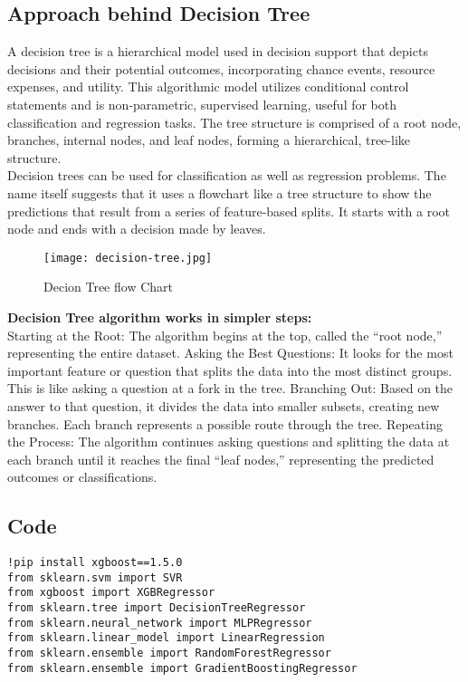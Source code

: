 \documentclass[12pt,a4paper]{report}
\begin{document}
\subsection{Approach behind Decision Tree}
A decision tree is a hierarchical model used in decision support that depicts decisions and their potential outcomes, incorporating chance events, resource expenses, and utility. This algorithmic model utilizes conditional control statements and is non-parametric, supervised learning, useful for both classification and regression tasks. The tree structure is comprised of a root node, branches, internal nodes, and leaf nodes, forming a hierarchical, tree-like structure.\\
Decision trees can be used for classification as well as regression problems. The name itself suggests that it uses a flowchart like a tree structure to show the predictions that result from a series of feature-based splits. It starts with a root node and ends with a decision made by leaves.
\begin{figure} [!ht]
    \centering
    \texttt{[image: decision-tree.jpg]}
    \caption{Decion Tree flow Chart}
    \label{fig:enter-label}
\end{figure}
\textbf{Decision Tree algorithm works in simpler steps:}\\
Starting at the Root: The algorithm begins at the top, called the “root node,” representing the entire dataset.
Asking the Best Questions: It looks for the most important feature or question that splits the data into the most distinct groups. This is like asking a question at a fork in the tree.
Branching Out: Based on the answer to that question, it divides the data into smaller subsets, creating new branches. Each branch represents a possible route through the tree.
Repeating the Process: The algorithm continues asking questions and splitting the data at each branch until it reaches the final “leaf nodes,” representing the predicted outcomes or classifications.
\subsection{Code}
\begin{lstlisting}
!pip install xgboost==1.5.0 
from sklearn.svm import SVR 
from xgboost import XGBRegressor 
from sklearn.tree import DecisionTreeRegressor 
from sklearn.neural_network import MLPRegressor 
from sklearn.linear_model import LinearRegression 
from sklearn.ensemble import RandomForestRegressor 
from sklearn.ensemble import GradientBoostingRegressor 
\end{lstlisting}
\end{document}
